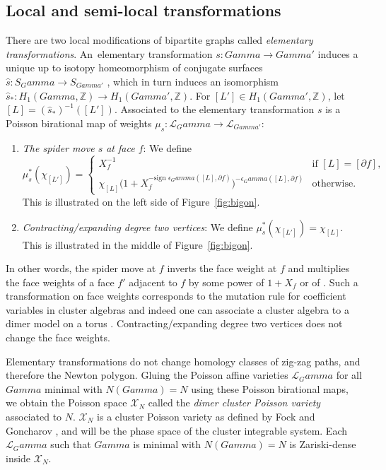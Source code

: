 \documentclass[10pt,a4paper]{amsart}
\numberwithin{equation}{section}
\newcommand{\Z}{{\mathbb Z}}
\newcommand{\ra}{\rightarrow}
\def\Gamma{Gamma}
\def\widehat#1{#1}
\begin{document}
\subsection{Local and semi-local transformations}
	
There are two local modifications of bipartite graphs called \emph{elementary transformations}. An~elementary transformation $s\colon \Gamma \ra \Gamma'$ induces a unique up to isotopy homeomorphism of conjugate surfaces {$\hat s \colon \widehat S_\Gamma \ra \widehat S_{\Gamma'}$} \cite[Lemma 4.1]{GK13}, which in turn induces an isomorphism $\hat s_*\colon H_1(\Gamma,\Z) \ra H_1(\Gamma',\Z)$. For $[L'] \in H_1(\Gamma',\Z)$, let $[L]=(\hat s_*)^{-1}([L'])$. Associated to the elementary transformation $s$ is a Poisson birational map of weights $\mu_s\colon \mathcal L_\Gamma \ra \mathcal L_{\Gamma'}$:
	\begin{enumerate}\itemsep=0pt
		\item \emph{The spider move $s$ at face $f$}: We define \[\mu_{s}^*(\chi_{[L']})=\begin{cases}
			X_f^{-1} &\text{if $[L]=[\partial f]$},\\
			\chi_{[L]}\big(1+X_f^{-\text{sign }\epsilon_\Gamma([L],\partial f)}\big)^{-\epsilon_\Gamma([L],\partial f)} & \text{otherwise.}
		\end{cases}
		\]
		This is illustrated on the left side of Figure~\ref{fig:bigon}.
		\item \emph{Contracting/expanding degree two vertices}: We define $\mu_s^*(\chi_{[L']})=\chi_{[L]}$. This is illustrated in the middle of Figure~\ref{fig:bigon}.
	\end{enumerate}
	In other words, the spider move at $f$ inverts the face weight at $f$ and multiplies the face weights of a face $f'$ adjacent to $f$ by some power of $1+X_f$ or of . Such a transformation on face weights corresponds to the mutation rule for coefficient variables in cluster algebras \cite{FG, FZ} and indeed one can associate a cluster algebra to a dimer model on a torus \cite{GK13}. Contracting/expanding degree two vertices does not change the face weights.
	
	
	Elementary transformations do not change homology classes of zig-zag paths, and therefore the Newton polygon. Gluing the Poisson affine varieties $\mathcal L_\Gamma$ for all $\Gamma$ minimal with $N(\Gamma)=N$ using these Poisson birational maps, we obtain the Poisson space $\mathcal X_N$ called the \emph{dimer cluster Poisson variety} associated to $N$. $\mathcal X_N$ is a cluster Poisson variety as defined by Fock and Goncharov \cite{FG}, and will be the phase space of the cluster integrable system. {Each $\mathcal L_\Gamma$ such that $\Gamma$ is minimal with $N(\Gamma)=N$ is Zariski-dense inside $\mathcal X_N$.}
	
\end{document}
